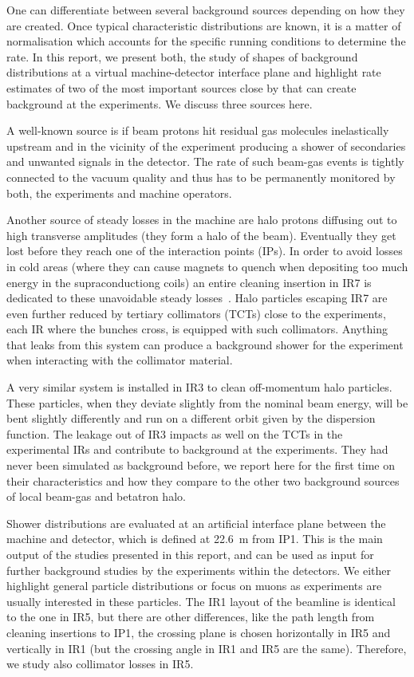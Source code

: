 One can differentiate between several background sources depending on how they are created. Once typical characteristic distributions are known, it is a matter of normalisation which accounts for the specific running conditions to determine the rate. In this report, we present both, the study of shapes of background distributions at a virtual machine-detector interface plane and highlight rate estimates of two of the most important sources close by that can create background at the experiments. We discuss three sources here.

A well-known source is if beam protons hit residual gas molecules inelastically upstream and in the vicinity of the experiment producing a shower of secondaries and unwanted signals in the detector. The rate of such beam-gas events is tightly connected to the vacuum quality and thus has to be permanently monitored by both, the experiments and machine operators.

Another source of steady losses in the machine are halo protons diffusing out to high transverse amplitudes (they form a halo of the beam). Eventually they get lost before they reach one of the interaction points (IPs). In order to avoid losses in cold areas (where they can cause magnets to quench when depositing too much energy in the supraconductiong coils) an entire cleaning insertion in IR7 is dedicated to these unavoidable steady losses~\cite{LHCDesignRep,assmann05chamonix}. Halo particles escaping IR7 are even further reduced by tertiary collimators (TCTs) close to the experiments, each IR where the bunches cross, is equipped with such collimators. Anything that leaks from this system can produce a background shower for the experiment when interacting with the collimator material. 

A very similar system is installed in IR3 to clean off-momentum halo particles. These particles, when they deviate slightly from the nominal beam energy, will be bent slightly differently and run on a different orbit given by the dispersion function. The leakage out of IR3 impacts as well on the TCTs in the experimental IRs and contribute to background at the experiments. They had never been simulated as background before, we report here for the first time on their characteristics and how they compare to the other two background sources of local beam-gas and betatron halo. 

Shower distributions are evaluated at an artificial interface plane between the machine and detector, which is defined at 22.6~m from IP1. This is the main output of the studies presented in this report, and can be used as input for further background studies by the experiments within the detectors. We either highlight general particle distributions or focus on muons as experiments are usually interested in these particles. The IR1 layout of the beamline is identical to the one in IR5, but there are other differences, like the path length from cleaning insertions to IP1, the crossing plane is chosen horizontally in IR5 and vertically in IR1 (but the crossing angle in IR1 and IR5 are the same). Therefore, we study also collimator losses in IR5.

